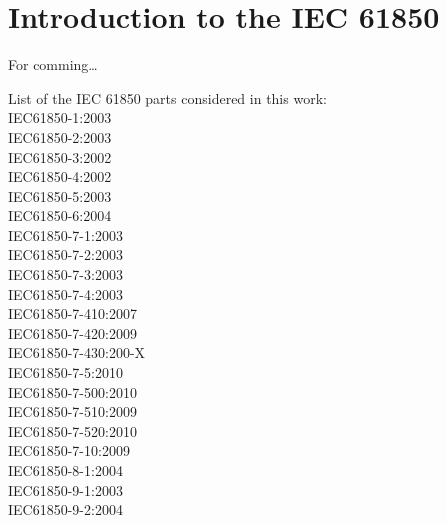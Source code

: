 \chapter{Introduction to the IEC 61850}
For comming\ldots  

List of the IEC 61850 parts considered 
in this work:  \\
IEC61850-1:2003 	\cite{IEC61850-1:2003} \\
IEC61850-2:2003		\cite{IEC61850-2:2003} \\
IEC61850-3:2002		\cite{IEC61850-3:2002} \\
IEC61850-4:2002		\cite{IEC61850-4:2002} \\
IEC61850-5:2003		\cite{IEC61850-5:2003} \\
IEC61850-6:2004		\cite{IEC61850-6:2004}  \\
IEC61850-7-1:2003	\cite{IEC61850-7-1:2003} \\
IEC61850-7-2:2003	\cite{IEC61850-7-2:2003} \\
IEC61850-7-3:2003	\cite{IEC61850-7-3:2003} \\
IEC61850-7-4:2003	\cite{IEC61850-7-4:2003} \\
IEC61850-7-410:2007	\cite{IEC61850-7-410:2007} \\
IEC61850-7-420:2009	\cite{IEC61850-7-420:2009} \\
IEC61850-7-430:200-X\cite{IEC61850-7-430:200-X} \\
IEC61850-7-5:2010	\cite{IEC61850-7-5:2010} \\
IEC61850-7-500:2010	\cite{IEC61850-7-500:2010} \\
IEC61850-7-510:2009	\cite{IEC61850-7-510:2009} \\
IEC61850-7-520:2010	\cite{IEC61850-7-520:2010} \\
IEC61850-7-10:2009	\cite{IEC61850-7-10:2009} \\
IEC61850-8-1:2004	\cite{IEC61850-8-1:2004} \\
IEC61850-9-1:2003	\cite{IEC61850-9-1:2003} \\
IEC61850-9-2:2004	\cite{IEC61850-9-2:2004} \\ 

